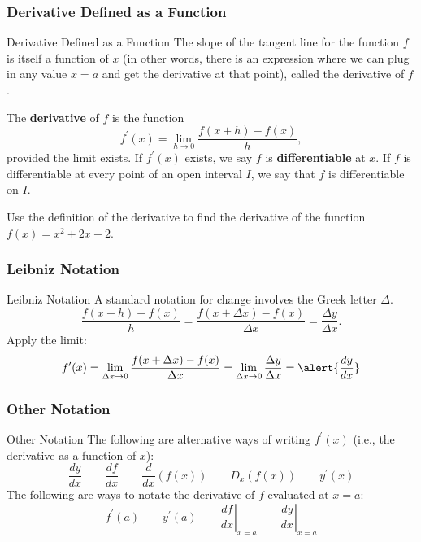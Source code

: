 \documentclass[cal1spr16Lectures.tex]{subfiles}
\begin{document}
\subsubsection{Derivative Defined as a Function}

\begin{frame}{\small Derivative Defined as a Function}\footnotesize
The slope of the tangent line for the function $f$ is itself a function of $x$ (in other words, there is an expression where we can plug in any value $x=a$ and get the derivative at that point), called the derivative of $f$.
\begin{dfn} The {\bf derivative} of $f$ is the function 
\[f^{\prime}(x)=\lim_{h \to 0} \frac{f(x+h)-f(x)}{h},\]
provided the limit exists.  If $f^{\prime}(x)$ exists, we say $f$ is {\bf differentiable} at $x$.  If $f$ is differentiable at every point of an open interval $I$, we say that $f$ is differentiable on $I$. \end{dfn}
\end{frame}

\begin{frame}
\begin{exe} Use the definition of the derivative to find the derivative of the function $f(x)=x^2+2x+2$. \end{exe}
\end{frame}

\subsubsection{Leibniz Notation}

\begin{frame}{\small Leibniz Notation}
A standard notation for change involves the Greek letter $\Delta$. 
\[\frac{f(x+h)-f(x)}{h}=\frac{f(x+\Delta x)-f(x)}{\Delta x}=\frac{\Delta y}{\Delta x}.\]
Apply the limit:
\[f^{\prime}(x)=\lim_{\Delta x \to 0} \frac{f(x+\Delta x)-f(x)}{\Delta x}=\lim_{\Delta x \to 0} \frac{\Delta y}{\Delta x}=\alert{\frac{dy}{dx}}\]
\end{frame}

\subsubsection{Other Notation}

\begin{frame}{\small Other Notation}
The following are alternative ways of writing $f^{\prime}(x)$ (i.e., the derivative as a function of $x$):
\[\frac{dy}{dx}\qquad\frac{df}{dx} \qquad\frac{d}{dx}\left(f(x)\right) \qquad D_x (f(x)) \qquad y^{\prime}(x)\]
The following are ways to notate the derivative of $f$ evaluated at $x=a$:
\[f^{\prime}(a)\qquad y^{\prime}(a) \qquad \left. \frac{df}{dx} \right|_{x=a} \qquad \left. \frac{dy}{dx} \right|_{x=a}\]
\end{frame}
\end{document}
